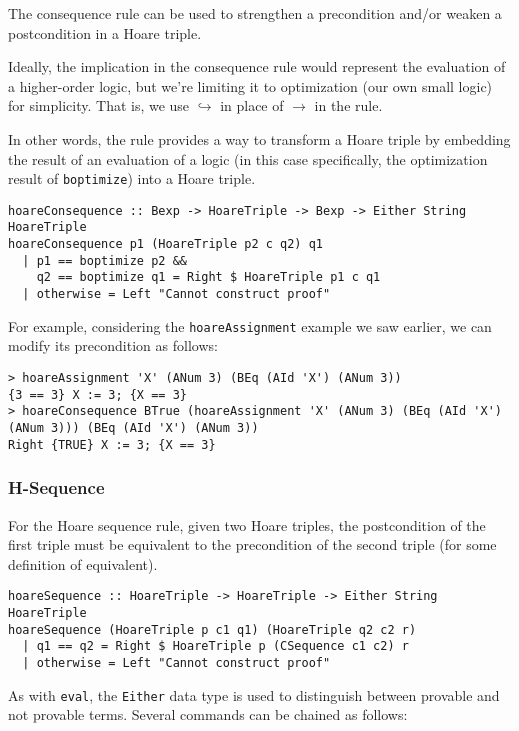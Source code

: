 \documentclass{article}
\begin{document}
The consequence rule can be used to strengthen a precondition and/or weaken a postcondition in a Hoare triple.

Ideally, the implication in the consequence rule would represent the evaluation of a higher-order logic, but we're limiting it to optimization (our own small logic) for simplicity. That is, we use $\hookrightarrow$ in place of $\to$ in the rule.

In other words, the rule provides a way to transform a Hoare triple by embedding the result of an evaluation of a logic (in this case specifically, the optimization result of \texttt{boptimize}) into a Hoare triple.

\begin{lstlisting}
hoareConsequence :: Bexp -> HoareTriple -> Bexp -> Either String HoareTriple
hoareConsequence p1 (HoareTriple p2 c q2) q1
  | p1 == boptimize p2 &&
    q2 == boptimize q1 = Right $ HoareTriple p1 c q1
  | otherwise = Left "Cannot construct proof"
\end{lstlisting}

For example, considering the \texttt{hoareAssignment} example we saw earlier, we can modify its precondition as follows:

\begin{lstlisting}
> hoareAssignment 'X' (ANum 3) (BEq (AId 'X') (ANum 3))
{3 == 3} X := 3; {X == 3}
> hoareConsequence BTrue (hoareAssignment 'X' (ANum 3) (BEq (AId 'X') (ANum 3))) (BEq (AId 'X') (ANum 3))
Right {TRUE} X := 3; {X == 3}
\end{lstlisting}

\subsubsection{H-Sequence}

For the Hoare sequence rule, given two Hoare triples, the postcondition of the first triple must be equivalent to the precondition of the second triple (for some definition of equivalent).

\begin{lstlisting}
hoareSequence :: HoareTriple -> HoareTriple -> Either String HoareTriple
hoareSequence (HoareTriple p c1 q1) (HoareTriple q2 c2 r)
  | q1 == q2 = Right $ HoareTriple p (CSequence c1 c2) r
  | otherwise = Left "Cannot construct proof"
\end{lstlisting}

As with \texttt{eval}, the \texttt{Either} data type is used to distinguish between provable and not provable terms. Several commands can be chained as follows:
\end{document}
